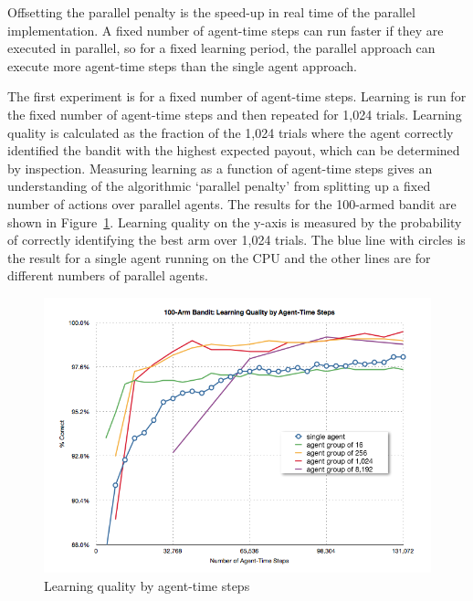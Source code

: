 \documentclass[11pt]{article} %
\begin{document}
\begin{flushleft}
Offsetting the parallel penalty is the speed-up in real time of the parallel implementation.  A fixed number of agent-time steps can run faster if they are executed in parallel, so for a fixed learning period, the parallel approach can execute more agent-time steps than the single agent approach.

The first experiment is for a fixed number of agent-time steps.  Learning is run for the fixed number of agent-time steps and then repeated for 1,024 trials.  Learning quality is calculated as the fraction of the 1,024 trials where the agent correctly identified the bandit with the highest expected payout, which can be determined by inspection.  Measuring learning as a function of agent-time steps gives an understanding of the algorithmic ‘parallel penalty’ from splitting up a fixed number of actions over parallel agents. The results for the 100-armed bandit are shown in Figure~\ref{fig:bandit_steps}.  Learning quality on the y-axis is measured by the probability of correctly identifying the best arm over 1,024 trials.  The blue line with circles is the result for a single agent running on the CPU and the other lines are for different numbers of parallel agents.

\end{flushleft}
\begin{figure}[hbtp]
\center
\includegraphics[scale=0.5]{fig02a}
\caption{Learning quality by agent-time steps}
\label{fig:bandit_steps}
\end{figure}
\end{document}
